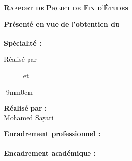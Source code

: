 \begin{center}
{\LARGE{\textbf{\textsc{Rapport de Projet de Fin d'Études}}}}\\
\vskip0.5cm
\large

{\textbf{Présenté en vue de l'obtention du}}\\
\vskip2mm
{\textbf{\@diplomaName}}\\
{\textbf{Spécialité : \@speciality}}\\
{}
\end{center}

\begin{center}
\textrm{Réalisé par}\\
\vskip0.3cm
{
    {%
        \begin{center}
            \large\textbf{\@author}~~~~~ et ~~~~~
            \large\textbf{\@secondAuthor}
        \end{center}
    }
    {\Large\textbf{\@author}}%
}
\vskip12mm


\begin{changemargin}{-9mm}{0cm}
\begin{minipage}[l]{1.1\columnwidth}
\begin{tcolorbox}[colframe=isiBlue,colback=white,boxrule=0pt,toprule=3pt,bottomrule=3pt,arc=0pt,top=0mm,right=0mm,left=0mm,bottom=0mm,boxsep=0.5mm]
    \begin{tcolorbox}[colframe=isiBlue,colback=white,boxrule=0pt,toprule=1pt,bottomrule=1pt,arc=0pt,enlarge bottom by=-0.9mm,auto outer arc]
        \centering
        {\huge\textbf{\@title}}
    \end{tcolorbox}
\end{tcolorbox}
\end{minipage}
\end{changemargin}

\end{center}
\vskip8mm%

\vspace{1.2cm}
\begin{minipage}[t]{0.46\textwidth}
\raggedright
\textbf{Réalisé par :}\\
Mohamed Sayari
\end{minipage}
\hfill
\begin{minipage}[t]{0.46\textwidth}
\raggedleft
\textbf{Encadrement professionnel :}\\
\@proFramerName\\[0.35cm]
\textbf{Encadrement académique :}\\
\textit{\@academicFramerName}
\end{minipage}
\vskip12mm

